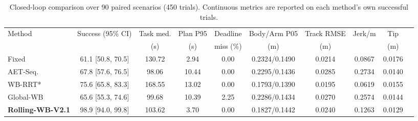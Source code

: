 \begin{table}[t]
\centering
\caption{Closed-loop comparison over 90 paired scenarios (450 trials). Continuous metrics are reported on each method's own successful trials.}
\label{tab:main_results}
\setlength{\tabcolsep}{3.1pt}
\begin{tabular}{lccccccccc}
\toprule
Method & Success (95\% CI) & Task med. & Plan P95 & Deadline & Body/Arm P05 & Track RMSE & Jerk/m & Tip \\
 &  & (s) & (s) & miss (\%) & (m) & (m) &  & (m) \\
\midrule
Fixed & 61.1 [50.8, 70.5] & 130.72 & 2.94 & 0.00 & 0.2324/0.1490 & 0.0214 & 0.0867 & 0.0176 \\
AET-Seq. & 67.8 [57.6, 76.5] & 98.06 & 10.44 & 0.00 & 0.2295/0.1436 & 0.0285 & 0.2734 & 0.0140 \\
WB-RRT* & 75.6 [65.8, 83.3] & 168.55 & 13.02 & 0.00 & 0.1793/0.1390 & 0.0195 & 0.0619 & 0.0155 \\
Global-WB & 65.6 [55.3, 74.6] & 99.68 & 10.39 & 2.25 & 0.2286/0.1434 & 0.0270 & 0.2574 & 0.0144 \\
\textbf{Rolling-WB-V2.1} & 98.9 [94.0, 99.8] & 103.62 & 3.70 & 0.00 & 0.1827/0.1442 & 0.0240 & 0.1263 & 0.0129 \\
\bottomrule
\end{tabular}
\end{table}
